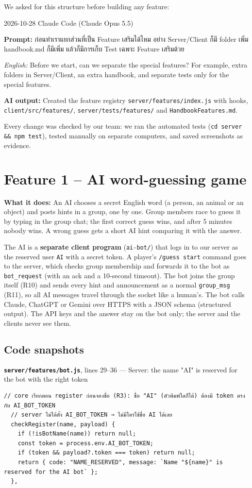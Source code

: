 \documentclass[11pt,a4paper]{article}
\newcommand{\code}[1]{\texttt{#1}}
\newcommand{\req}[1]{\begin{tcolorbox}[colback=accent!6,colframe=accent!60,boxrule=0.5pt,left=4pt,right=4pt,top=2pt,bottom=2pt]\textbf{What it does:} #1\end{tcolorbox}}
\newcommand{\snap}[3]{\par\medskip\textbf{\code{#1}}, lines #2 --- #3}
\newcommand{\promptbox}[4]{%
\begin{tcolorbox}[colback=codebg,colframe=gray!50,boxrule=0.4pt,left=4pt,right=4pt,top=2pt,bottom=2pt]
{\small #1 \quad Claude Code (Claude Opus 5.5)}\par
\textbf{Prompt:} #2\par
\textit{English:} #3\par
\textbf{AI output:} #4
\end{tcolorbox}}
\begin{document}
We asked for this structure before building any feature:

\promptbox{2026-10-28}{ก่อนทำเราแยกส่วนที่เป็น Feature เสริมได้ไหม อย่าง Server/Client ก็มี folder เพิ่ม handbook.md ก็มีเพิ่ม แล้วก็มีการเก็บ Test เฉพาะ Feature เสริมด้วย}{Before we start, can we separate the special features? For example, extra folders in Server/Client, an extra handbook, and separate tests only for the special features.}{Created the feature registry \code{server/features/index.js} with hooks, \code{client/src/features/}, \code{server/tests/features/} and \code{HandbookFeatures.md}.}

Every change was checked by our team: we ran the automated tests (\code{cd server \&\& npm test}),
tested manually on separate computers, and saved screenshots as evidence.

\clearpage
\section{Feature 1 -- AI word-guessing game}
\req{An AI chooses a secret English word (a person, an animal or an object) and posts hints
in a group, one by one. Group members race to guess it by typing in the group chat; the first correct guess
wins, and after 5 minutes nobody wins. A wrong guess gets a short AI hint comparing it with the answer.}

The AI is a \textbf{separate client program} (\code{ai-bot/}) that logs in to our server as
the reserved user \code{AI} with a secret token. A player's \code{/guess start} command goes to the server,
which checks group membership and forwards it to the bot as \code{bot\_request} (with an ack and a 10-second
timeout). The bot joins the group itself (R10) and sends every hint and announcement as a normal
\code{group\_msg} (R11), so all AI messages travel through the socket like a human's. The bot calls
Claude, ChatGPT or Gemini over HTTPS with a JSON schema (structured output). The API keys and the
answer stay on the bot only; the server and the clients never see them.

\subsection*{Code snapshots}
\snap{server/features/bot.js}{29--36}{Server: the name "AI" is reserved for the bot with the right token}
\begin{Verbatim}[firstnumber=29]
  // core เรียกตอน register ก่อนจองชื่อ (R3): ชื่อ "AI" (ตัวพิมพ์ใดก็ได้) ต้องมี token ตรงกับ AI_BOT_TOKEN
  // server ไม่ได้ตั้ง AI_BOT_TOKEN → ไม่มีใครใช้ชื่อ AI ได้เลย
  checkRegister(name, payload) {
    if (!isBotName(name)) return null;
    const token = process.env.AI_BOT_TOKEN;
    if (token && payload?.token === token) return null;
    return { code: "NAME_RESERVED", message: `Name "${name}" is reserved for the AI bot` };
  },
\end{Verbatim}
\end{document}
